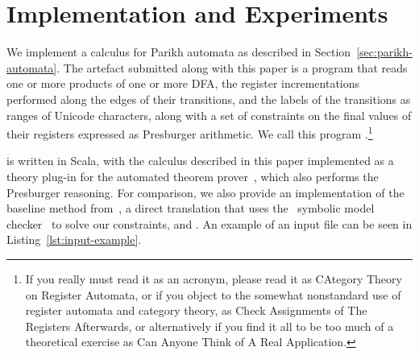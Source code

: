 \documentclass[acmsmall,review,anonymous]{acmart}\settopmatter{printfolios=true,printccs=false,printacmref=true}
\theoremstyle{definition}
\begin{document}
\section{Implementation and Experiments}\label{sec:implementation}

We implement a calculus for Parikh automata as described in
Section~\ref{sec:parikh-automata}. The artefact submitted along with this paper
is a program that reads one or more products of one or more DFA, the register
incrementations performed along the edges of their transitions, and the labels
of the transitions as ranges of Unicode characters, along with a set of
constraints on the final values of their registers expressed as Presburger
arithmetic. We call this program \Catra{}.\footnote{If you really must read it
as an acronym, please read it as CAtegory Theory on Register Automata, or if you
object to the somewhat nonstandard use of register automata and category theory,
as Check Assignments of The Registers Afterwards, or alternatively if you find it
all to be too much of a theoretical exercise as Can Anyone Think of A Real
Application.}

\Catra{} is written in Scala, with the calculus described in this paper
implemented as a theory plug-in for the \Princess{} automated theorem
prover~\cite{princess}, which also performs the Presburger reasoning. For
comparison, we also provide an implementation of the baseline method
from~\cite{generate-parikh-image}, a direct translation that uses the~\Nuxmv{}
symbolic model checker~\cite{nuxmv} to solve our constraints, and . An example of an input file  can be seen in Listing~\ref{lst:input-example}.
\end{document}
